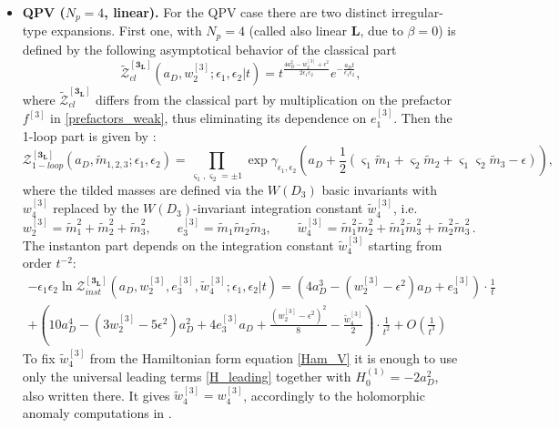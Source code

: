 \documentclass[12pt,a4paper]{article}
\numberwithin{equation}{section}
\newcommand{\D}{\scriptscriptstyle{D}}
\begin{document}
\begin{itemize}
    \item {\bf QPV ($N_p=4$, linear).}
For the QPV case there are two distinct irregular-type expansions. First one, with $N_p=4$ (called also linear $\mathbf{L}$, due to $\beta=0$) is defined by the following asymptotical behavior of the classical part 
\begin{equation}
\widetilde{\mathcal{Z}}^{[\mathbf{3_L}]}_{cl}(a_{\D},w_2^{[3]};\epsilon_1,\epsilon_2|t)=t^{\frac{4a_{\D}^2-w_2^{[3]}+\epsilon^2}{2\epsilon_1\epsilon_2}}e^{-\frac{a_{\D}t}{\epsilon_1\epsilon_2}},  
\end{equation}
where $\widetilde{\mathcal{Z}}_{cl}^{[\mathbf{3_L}]}$ differs from the classical part \cite[(4.9)]{BST25} by multiplication on the prefactor $f^{[3]}$ in \eqref{prefactors_weak}, thus eliminating its dependence on $e_1^{[3]}$. Then the 1-loop part is given by \cite[(4.18)]{BST25}:
    \begin{equation}\label{Z1loop_3L}
\mathcal{Z}_{1-loop}^{[\mathbf{3_L}]}(a_{\D},\tilde{m}_{1,2,3};\epsilon_1,\epsilon_2)= \prod\limits_{\varsigma_1,\varsigma_2=\pm1}  \exp \gamma_{\epsilon_1,\epsilon_2} \left(a_{\D}{+}\frac12(\varsigma_1 \tilde{m}_1{+}\varsigma_2 \tilde{m}_2{+}\varsigma_1 \varsigma_2 \tilde{m}_3{-}\epsilon)\right),
\end{equation}
where the tilded masses are defined via the $W(D_3)$ basic invariants with $w_4^{[3]}$ replaced by the $W(D_3)$-invariant integration constant $\tilde{w}_4^{[3]}$, i.e.
\begin{equation}
w_2^{[3]}=\tilde{m}_1^2+\tilde{m}_2^2+\tilde{m}_3^2, \qquad e_3^{[3]}=\tilde{m}_1\tilde{m}_2\tilde{m}_3, \qquad \tilde{w}_4^{[3]}=\tilde{m}_1^2 \tilde{m}_2^2+\tilde{m}_1^2 \tilde{m}_3^2+\tilde{m}_2^2 \tilde{m}_3^2\, .
\end{equation}
The instanton part \cite[(4.14)]{BST25} depends on the integration constant $\tilde{w}_4^{[3]}$ starting from order $t^{-2}$: 
\begin{multline}
-\epsilon_1\epsilon_2 \ln \mathcal{Z}_{inst}^{[\mathbf{3_L}]}(a_{\D},w_2^{[3]},e_3^{[3]},\tilde{w}_4^{[3]};\epsilon_1,\epsilon_2|t)=\left(4a_{\D}^3-(w_2^{[3]}{-}\epsilon^2)a_{\D}+e_3^{[3]}\right)\cdot\frac1{t}\\+\left(10 a_{\D}^4-(3w_2^{[3]}{-}5\epsilon^2)a_{\D}^2+4e_3^{[3]} a_{\D} +\frac{(w_2^{[3]}{-}\epsilon^2)^2}8-\frac{\tilde{w}_4^{[3]}}2\right)\cdot\frac1{t^2}+O\left(\frac1{t^3}\right)
\end{multline}
To fix $\tilde{w}_4^{[3]}$ from the Hamiltonian form equation \eqref{Ham_V} it is enough to use only the universal leading terms \eqref{H_leading} together with $H_0^{(1)}=-2a_{\D}^2$, also written there. It gives $\tilde{w}_4^{[3]}=w_4^{[3]}$, accordingly to the holomorphic anomaly computations in \cite[Sec. 5.1]{BST25}.

\end{itemize}
\end{document}
